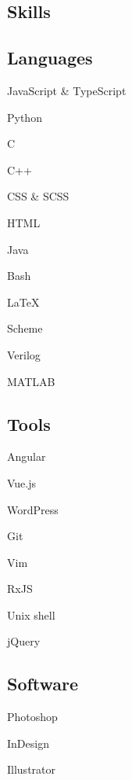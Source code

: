 \documentclass[letterpaper]{article}
\begin{document}
\begin{minipage}[t]{\dimexpr.33\textwidth-.5\columnsep}
\begin{flushleft}
\section{Skills}
\begin{minipage}[t]{.5\textwidth}
\begin{flushleft}

\subsection{Languages}
\begin{skillslist}
    \item JavaScript \& TypeScript
    \item Python
    \item C
    \item C++
    \item CSS \& SCSS
    \item HTML
    \item Java
    \item Bash
    \item \textrm{\LaTeX}
    \item Scheme
    \item Verilog
    \item MATLAB
\end{skillslist}

\end{flushleft}
\end{minipage}%
\begin{minipage}[t]{.5\textwidth}

\subsection{Tools}
\begin{skillslist}
    \item Angular
    \item Vue.js
    \item WordPress
    \item Git
    \item Vim
    \item RxJS
    \item Unix shell
    \item jQuery
\end{skillslist}

\subsection{Software}
\begin{skillslist}
    \item Photoshop
    \item InDesign
    \item Illustrator
\end{skillslist}

\end{minipage}

\end{flushleft}
\end{minipage}
\end{document}
